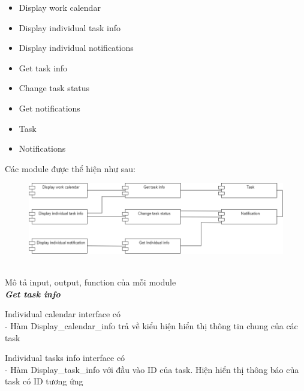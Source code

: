 \documentclass[a4paper]{article}
\begin{document}
\begin{itemize}
\begin{itemize}
        \item Display work calendar
        \item Display individual task info
        \item Display individual notifications
        \item Get task info
        \item Change task status
        \item Get notifications
        \item Task
        \item Notifications
 \end{itemize}
    Các module được thể hiện như sau:\\
    \begin{figure}[!h]
    \begin{center}
      \includegraphics[width=6in]{Image/cal-m.png}
    \end{center}
\end{figure} \\
    Mô tả input, output, function của mỗi module\\
\textbf{    \textit{Get task info} } \\
\begin{minipage}[b]{0.4\textwidth}
Individual calendar interface có \\
- Hàm Display\_calendar\_info trả về kiểu hiện hiển thị thông tin chung của các task
\end{minipage}
\hfill
{}
\newpage
\begin{minipage}[b]{0.4\textwidth}
Individual tasks info interface có \\
- Hàm Display\_task\_info với đầu vào ID của task. Hiện hiển thị thông báo của task có ID tương ứng
\end{minipage}
\hfill
{}

\end{itemize}
\end{document}
